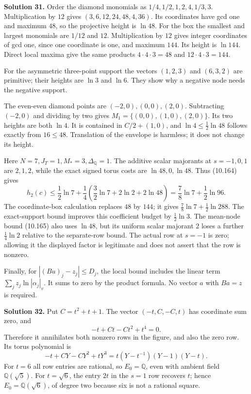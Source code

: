 \documentclass[
  11pt,
  a4paper,
]{article}
\begin{document}
\textbf{Solution 31.} Order the diamond monomials as
\(1/4,1/2,1,2,4,1/3,3\). Multiplication by \(12\) gives
\((3,6,12,24,48,4,36)\). Its coordinates have gcd one and maximum
\(48\), so the projective height is \(\ln48\). For the box the smallest
and largest monomials are \(1/12\) and \(12\). Multiplication by \(12\)
gives integer coordinates of gcd one, since one coordinate is one, and
maximum \(144\). Its height is \(\ln144\). Direct local maxima give the
same products \(4\cdot4\cdot3=48\) and \(12\cdot4\cdot3=144\).

For the asymmetric three-point support the vectors \((1,2,3)\) and
\((6,3,2)\) are primitive; their heights are \(\ln3\) and \(\ln6\). They
show why a negative node needs the negative support.

The even-even diamond points are \((-2,0),(0,0),(2,0)\). Subtracting
\((-2,0)\) and dividing by two gives \(M_1=\{(0,0),(1,0),(2,0)\}\). Its
two heights are both \(\ln4\). It is contained in \(C/2+(1,0)\), and
\(\ln4\le\tfrac12\ln48\) follows exactly from \(16\le48\). Translation
of the envelope is harmless; it does not change its height.

Here \(N=7,J_T=1,M_*=3,\Delta_{\mathbb Q}=1\). The additive scalar
majorants at \(s=-1,0,1\) are \(2,1,2\), while the exact signed torus
costs are \(\ln48,0,\ln48\). Thus (10.164) gives \[
h_2(c)\le\frac12\ln7+
\frac14\left(\frac32\ln7+2\ln2+2\ln48\right)
=\frac78\ln7+\frac12\ln96.
\] The coordinate-box calculation replaces \(48\) by \(144\); it gives
\(\tfrac78\ln7+\tfrac12\ln288\). The exact-support bound improves this
coefficient budget by \(\tfrac12\ln3\). The mean-node bound (10.165)
also uses \(\ln48\), but its uniform scalar majorant \(2\) loses a
further \(\tfrac14\ln2\) relative to the separate-row bound. The actual
row at \(s=-1\) is zero; allowing it the displayed factor is legitimate
and does not assert that the row is nonzero.

Finally, for \(|(Bu)_j-z_j|\le D_j\), the local bound includes the
linear term \(\sum_j z_j\ln|\alpha_j|_v\). It sums to zero by the
product formula. No vector \(a\) with \(Ba=z\) is required.

\textbf{Solution 32.} Put \(C=t^2+t+1\). The vector \((-t,C,-C,t)\) has
coordinate sum zero, and \[
-t+Ct-Ct^2+t^4=0.
\] Therefore it annihilates both nonzero rows in the figure, and also
the zero row. Its torus polynomial is \[
-t+CY-CY^2+tY^3=t(Y-t^{-1})(Y-1)(Y-t).
\] For \(t=6\) all row entries are rational, so \(E_0=\mathbb Q\), even
with ambient field \(\mathbb Q(\sqrt5)\). For \(t=\sqrt6\), the entry
\(2t\) in the \(s=1\) row recovers \(t\); hence
\(E_0=\mathbb Q(\sqrt6)\), of degree two because six is not a rational
square.
\end{document}
